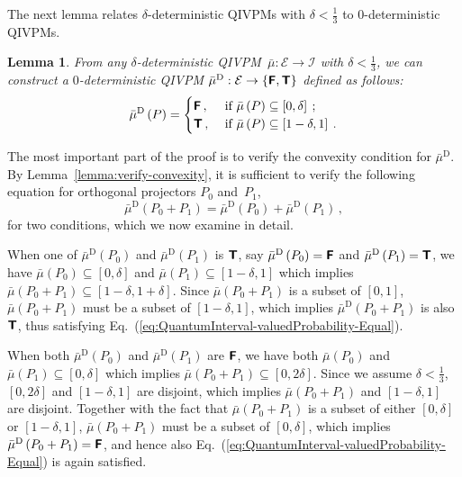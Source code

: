 \documentclass[english,reprint, aps, prl,superscriptaddress, showpacs,
showkeys, longbibliography, amsmath, amssymb, floatfix]{revtex4-1}
\theoremstyle{plain}
\newtheorem{lemma}{Lemma}
\theoremstyle{definition}
\newcommand{\events}{\ensuremath{\mathcal{E}}}
\newcommand{\interval}[1]{{\normalfont\textsf{\textbf{#1}}}}
\newcommand{\imposs}{\interval{F}}
\newcommand{\necess}{\interval{T}}
\begin{document}
The next lemma relates $\delta$-deterministic QIVPMs with $\delta <
\frac{1}{3}$ to 0-deterministic QIVPMs. 

\begin{lemma}\label{lemma:delta2zero} 
  From any $\delta$-deterministic
  QIVPM~$\bar{\mu}:\events\rightarrow\mathscr{I}$ with
  $\delta < \frac{1}{3}$, we can construct a $0$-deterministic QIVPM
  $\bar{\mu}^{\textrm{D}}:\events\rightarrow\left\{
    \imposs,\necess\right\}$ defined as follows:
\begin{equation}
\bar{\mu}^{\textrm{D}}\left(P\right)=\begin{cases}
\imposs\,, & \textrm{ if }\bar{\mu}\left(P\right)\subseteq\left[0,\delta\right]\:;\\
\necess\,, & \textrm{ if }\bar{\mu}\left(P\right)\subseteq\left[1-\delta,1\right]\:.
\end{cases}
\end{equation}
\end{lemma}
\noindent The most important part of the proof is to verify the convexity
condition for $\bar{\mu}^{\textrm{D}}$. By Lemma~\ref{lemma:verify-convexity}, it is sufficient
to verify the following equation for orthogonal projectors $P_{0}$
and~$P_{1}$,
\begin{equation}
\bar{\mu}^{\textrm{D}}\left(P_{0}+P_{1}\right)=\bar{\mu}^{\textrm{D}}\left(P_{0}\right)+\bar{\mu}^{\textrm{D}}\left(P_{1}\right)\,, \label{eq:QuantumInterval-valuedProbability-Equal}
\end{equation}
for two conditions, which we now examine in detail.

When one of $\bar{\mu}^{\textrm{D}}\left(P_{0}\right)$ and $\bar{\mu}^{\textrm{D}}\left(P_{1}\right)$
is $\necess$, say $\bar{\mu}^{\textrm{D}}\left(P_{0}\right)=\imposs$
and $\bar{\mu}^{\textrm{D}}\left(P_{1}\right)=\necess$, we have $\bar{\mu}\left(P_{0}\right)\subseteq\left[0,\delta\right]$
and $\bar{\mu}\left(P_{1}\right)\subseteq\left[1-\delta,1\right]$ which
implies $\bar{\mu}\left(P_{0}+P_{1}\right)\subseteq\left[1-\delta,1+\delta\right]$.
Since $\bar{\mu}\left(P_{0}+P_{1}\right)$ is a subset of $\left[0,1\right]$,
$\bar{\mu}\left(P_{0}+P_{1}\right)$ must be a subset of $\left[1-\delta,1\right]$,
which implies $\bar{\mu}^{\textrm{D}}\left(P_{0}+P_{1}\right)$ is also
$\necess$, thus satisfying Eq.~(\ref{eq:QuantumInterval-valuedProbability-Equal}).

When both
$\bar{\mu}^{\textrm{D}}\left(P_{0}\right)$ and $\bar{\mu}^{\textrm{D}}\left(P_{1}\right)$
are $\imposs$, we have both $\bar{\mu}\left(P_{0}\right)$ and
$\bar{\mu}\left(P_{1}\right)\subseteq\left[0,\delta\right]$ which
implies
$\bar{\mu}\left(P_{0}+P_{1}\right)\subseteq\left[0,2\delta\right]$.
Since we assume $\delta<\frac{1}{3}$, $\left[0,2\delta\right]$ and
$\left[1-\delta,1\right]$ are disjoint, which implies
$\bar{\mu}\left(P_{0}+P_{1}\right)$ and $\left[1-\delta,1\right]$ are
disjoint. Together with the fact that
$\bar{\mu}\left(P_{0}+P_{1}\right)$ is a subset of either
$\left[0,\delta\right]$ or $\left[1-\delta,1\right]$,
$\bar{\mu}\left(P_{0}+P_{1}\right)$ must be a subset of
$\left[0,\delta\right]$, which implies
$\bar{\mu}^{\textrm{D}}\left(P_{0}+P_{1}\right)=\imposs$, and hence
also Eq.~(\ref{eq:QuantumInterval-valuedProbability-Equal}) is again satisfied.
\end{document}
